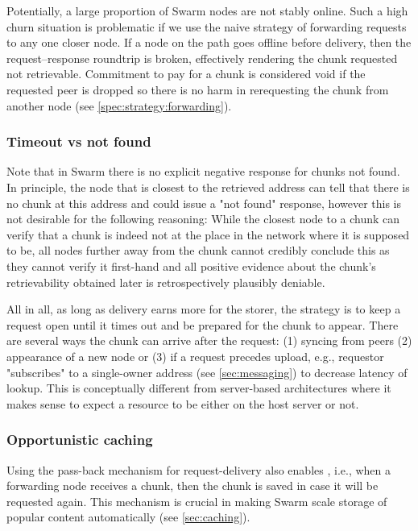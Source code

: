 Potentially, a large proportion of Swarm nodes are not stably online. Such a high churn situation is problematic if we use the naive strategy of forwarding requests to any one closer node. If a node on the path goes offline before delivery, then the request--response roundtrip is broken, effectively rendering the chunk requested not retrievable. Commitment to pay for a chunk is considered void if the requested peer is dropped so there is no harm in rerequesting the chunk from another node (see \ref{spec:strategy:forwarding}).


\subsubsection{Timeout vs not found}

Note that in Swarm there is no explicit negative response for chunks not found. In principle, the node that is closest to the retrieved address can tell that there is no chunk at this address and could issue a "not found" response, however this is not desirable for the following reasoning: While the closest node to a chunk can verify that a chunk is indeed not at the place in the network where it is supposed to be, all nodes further away from the chunk cannot credibly conclude this as they cannot verify it first-hand and all positive evidence about the chunk's retrievability obtained later is retrospectively plausibly deniable. 

All in all, as long as delivery earns more for the storer, the strategy is to keep a request open until it times out and be prepared for the chunk to appear. There are several ways the chunk can arrive after the request: (1) syncing from peers (2) appearance of a new node or (3) if a request precedes upload, e.g., requestor "subscribes" to a single-owner address (see \ref{sec:messaging}) to  decrease latency of lookup. This is conceptually different from server-based architectures where it makes sense to expect a resource to be either on the host server or not. 
 

\subsubsection{Opportunistic caching}

Using the pass-back mechanism for request-delivery also enables , i.e., when a forwarding node receives a chunk, then the chunk is saved in case it will be requested again. This mechanism is crucial in making Swarm scale storage of popular content automatically (see \ref{sec:caching}).

